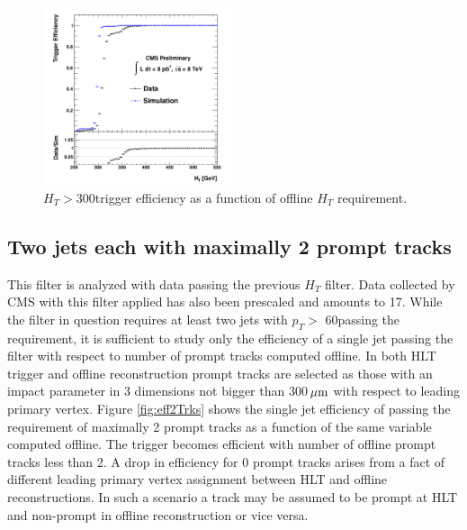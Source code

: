 \begin{figure}[htbp]
\centering
 \includegraphics[width=0.49\textwidth]{plots/trigger/effHT300.pdf}
\caption{$H_T>$300\GeV trigger efficiency as a function of offline $H_T$ requirement. \label{fig:effHT300}}
\end{figure} 

\subsection{Two jets each with maximally 2 prompt tracks}
\label{subsec:trig2Trks}

This filter is analyzed with data passing the previous 
$H_T$ filter. Data collected by CMS with this filter applied has also been prescaled and 
amounts to 17\pbinv.  
While the filter in question
 requires at least two jets with $p_T>$ 60\GeV passing the requirement, it is sufficient to study
 only the efficiency
 of a single jet passing the filter with respect to number of prompt tracks computed offline.
 In both HLT trigger and offline
 reconstruction prompt tracks are selected as those with an impact parameter in 3 dimensions 
not bigger than 300$\,\mu\text{m}$
 with respect to leading primary vertex. Figure \ref{fig:eff2Trks} shows the single jet efficiency of passing
 the requirement of maximally 2 prompt tracks as a function of the same variable computed offline.
 The trigger becomes efficient with number of offline prompt tracks less than 2. 
A drop in efficiency for 0 prompt tracks arises from a fact of different leading primary vertex assignment 
between HLT and offline reconstructions. 
In such a scenario a track may be assumed to be prompt at HLT and non-prompt
 in offline reconstruction or vice versa. 
  

